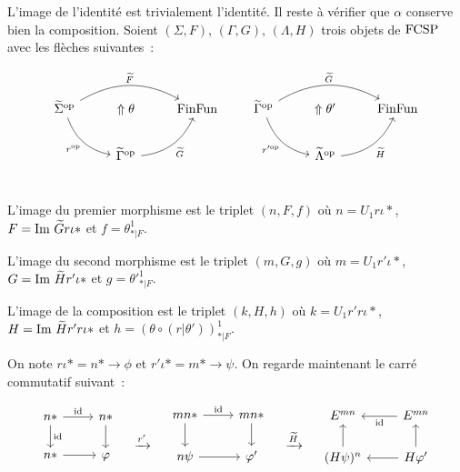 \begin{pv}
    L'image de l'identité est trivialement l'identité. Il reste à vérifier que $\alpha$
    conserve bien la composition. Soient $(\Sigma,F)$, $(\Gamma,G)$, $(\Lambda,H)$ trois
    objets de $\text{FCSP}$ avec les flèches suivantes~:

    \[\begin{tikzcd}
        \tsigma^\op\arrow[dr, bend right, swap, "r^\op"]\arrow[rr, bend left, "\tf"]
            & \Uparrow\theta
            & \ffun \\
        & \tgamma^\op\arrow[ur, bend right, swap, "\tg"] \\
    \end{tikzcd}\qquad\begin{tikzcd}
        \tgamma^\op\arrow[dr, bend right, swap, "r'^\op"]\arrow[rr, bend left, "\tg"]
            & \Uparrow\theta'
            & \ffun \\
        & \tlambda^\op\arrow[ur, bend right, swap, "\tH"] \\
    \end{tikzcd}\]

    L'image du premier morphisme est le triplet $(n,F,f)$ où $n = U_1r\iota\ast$,
    $F = \text{Im } \widetilde{G} r\iota\ast$ et $f = \theta^1_{\ast|F}$.

    L'image du second morphisme est le triplet $(m,G,g)$ où $m = U_1r'\iota\ast$,
    $G = \text{Im } \widetilde{H} r'\iota\ast$ et $g = \theta'^1_{\ast|F}$.

    L'image de la composition est le triplet $(k,H,h)$ où $k = U_1r'r\iota\ast$,
    $H = \text{Im } \widetilde{H} r'r\iota\ast$ et $h = (\theta\circ(r|\theta'))^1_{\ast|F}$.

    On note $r\iota\ast = n\ast\rightarrow\phi$ et
    $r'\iota\ast = m\ast\rightarrow\psi$. On regarde maintenant le carré commutatif
    suivant~:

    \[\begin{tikzcd}
        n\ast\arrow[d,"\id"]\arrow[r,"\id"] & n\ast\arrow[d] \\
        n\ast\arrow[r] & \phi \\
    \end{tikzcd}\quad\xrightarrow{r'}\quad\begin{tikzcd}
        mn\ast\arrow[r, "\id"]\arrow[d] & mn\ast\arrow[d] \\
        n\psi\arrow[r] & \phi' \\
    \end{tikzcd}\quad\xrightarrow{\tH}\quad\begin{tikzcd}
        E^{mn} & E^{mn}\arrow[l, "\id"] \\
        (H\psi)^n\arrow[u] & H\phi'\arrow[l]\arrow[u] \\
    \end{tikzcd}\]


\end{pv}
